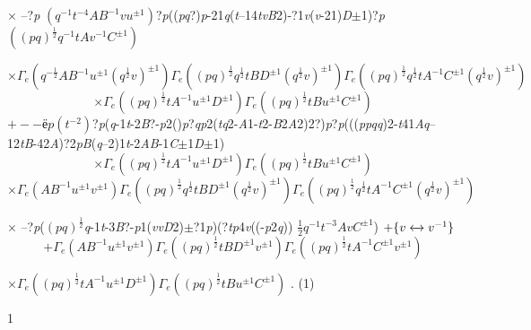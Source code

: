 \documentclass[a4paper,12pt]{article}
\begin{document}
$\times$ --?{\it p} $(q^{-1}t^{-4}AB^{-1}vu^{\pm 1})$?{\it p}(({\it pq}?){\it p}-21{\it q}({\it t}--14{\it tvB}2)-?1{\it v}({\it v}-21){\it D}$\pm$1)?{\it p} $((pq)^{\frac{1}{2}}q^{-1}tAv^{-1}C^{\pm 1})$

$\times\Gamma_{e}(q^{-\frac{1}{2}}AB^{-1}u^{\pm 1}(q^{\frac{1}{2}}v)^{\pm 1})\Gamma_{e}((pq)^{\frac{1}{2}}q^{\frac{1}{2}}tBD^{\pm 1}(q^{\frac{1}{2}}v)^{\pm 1})\Gamma_{e}((pq)^{\frac{1}{2}}q^{\frac{1}{2}}tA^{-1}C^{\pm 1}(q^{\frac{1}{2}}v)^{\pm 1})$
$$
\times\Gamma_{e}((pq)^{\frac{1}{2}}tA^{-1}u^{\pm 1}D^{\pm 1})\Gamma_{e}((pq)^{\frac{1}{2}}tBu^{\pm 1}C^{\pm 1})
$$
$+--ё p (t^{-2})$?{\it p}({\it q}-1{\it t}-2{\it B}?-{\it p}2(){\it p}?{\it qp}2({\it tq}2-{\it A}1-{\it t}2-{\it B}2{\it A}2)2?){\it p}?{\it p}((({\it ppqq})2-{\it t}41{\it Aq}--12{\it tB}-42{\it A})?2{\it pB}({\it q}--2)1{\it t}-2{\it AB}-1{\it C}$\pm$1{\it D}$\pm$1)
$$
\times\Gamma_{e}((pq)^{\frac{1}{2}}tA^{-1}u^{\pm 1}D^{\pm 1})\Gamma_{e}((pq)^{\frac{1}{2}}tBu^{\pm 1}C^{\pm 1})
$$
$\times\Gamma_{e}(AB^{-1}u^{\pm 1}v^{\pm 1})\Gamma_{e}((pq)^{\frac{1}{2}}q^{\frac{1}{2}}tBD^{\pm 1}(q^{\frac{1}{2}}v)^{\pm 1})\Gamma_{e}((pq)^{\frac{1}{2}}q^{\frac{1}{2}}tA^{-1}C^{\pm 1}(q^{\frac{1}{2}}v)^{\pm 1})$

$\times$ --?{\it p}($(pq)^{\frac{1}{2}}${\it q}-1{\it t}-3{\it B}?-{\it p}1({\it vvD}2)$\pm$?1{\it p})(?{\it tp}4{\it v}((-{\it p}2{\it q})) $\displaystyle \frac{1}{2}q^{-1}t^{-3}AvC^{\pm 1}$) $+\{v\xleftrightarrow{}v^{-1}\}$
$$
+\Gamma_{e}(AB^{-1}u^{\pm 1}v^{\pm 1})\Gamma_{e}((pq)^{\frac{1}{2}}tBD^{\pm 1}v^{\pm 1})\Gamma_{e}((pq)^{\frac{1}{2}}tA^{-1}C^{\pm 1}v^{\pm 1})
$$
\begin{center}
$\times\Gamma_{e}((pq)^{\frac{1}{2}}tA^{-1}u^{\pm 1}D^{\pm 1})\Gamma_{e}((pq)^{\frac{1}{2}}tBu^{\pm 1}C^{\pm 1})$ . (1)
\end{center}
1
\end{document}
